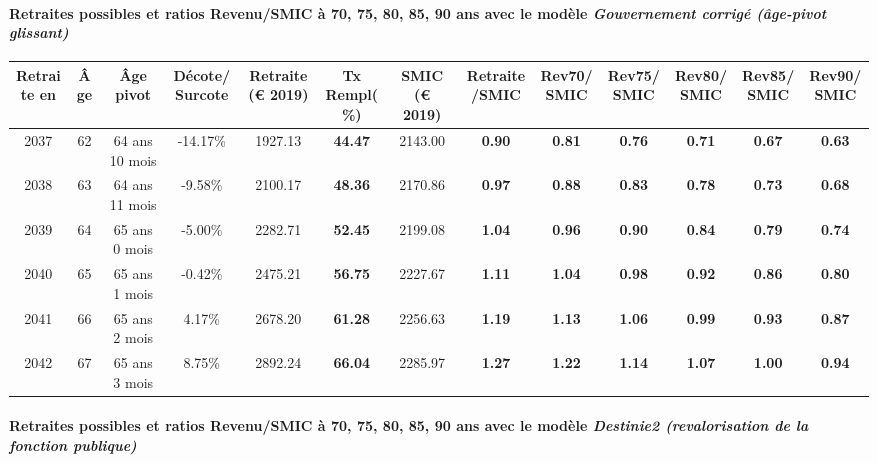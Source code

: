 \paragraph{Retraites possibles et ratios Revenu/SMIC à 70, 75, 80, 85, 90 ans avec le modèle \emph{Gouvernement corrigé (âge-pivot glissant)}}  
 
{ \scriptsize \begin{center} 
\begin{tabular}[htb]{|c|c||c|c||c|c||c||c|c|c|c|c|c|} 
\hline 
 Retraite en &  Âge &  Âge pivot &  Décote/Surcote &  Retraite (\euro{} 2019) &  Tx Rempl(\%) &  SMIC (\euro{} 2019) &  Retraite/SMIC &  Rev70/SMIC &  Rev75/SMIC &  Rev80/SMIC &  Rev85/SMIC &  Rev90/SMIC \\ 
\hline \hline 
 2037 &  62 &  64 ans 10 mois &  -14.17\% &  1927.13 &  {\bf 44.47} &  2143.00 &  {\bf {\color{red} 0.90}} &  {\bf {\color{red} 0.81}} &  {\bf {\color{red} 0.76}} &  {\bf {\color{red} 0.71}} &  {\bf {\color{red} 0.67}} &  {\bf {\color{red} 0.63}} \\ 
\hline 
 2038 &  63 &  64 ans 11 mois &  -9.58\% &  2100.17 &  {\bf 48.36} &  2170.86 &  {\bf {\color{red} 0.97}} &  {\bf {\color{red} 0.88}} &  {\bf {\color{red} 0.83}} &  {\bf {\color{red} 0.78}} &  {\bf {\color{red} 0.73}} &  {\bf {\color{red} 0.68}} \\ 
\hline 
 2039 &  64 &  65 ans 0 mois &  -5.00\% &  2282.71 &  {\bf 52.45} &  2199.08 &  {\bf 1.04} &  {\bf {\color{red} 0.96}} &  {\bf {\color{red} 0.90}} &  {\bf {\color{red} 0.84}} &  {\bf {\color{red} 0.79}} &  {\bf {\color{red} 0.74}} \\ 
\hline 
 2040 &  65 &  65 ans 1 mois &  -0.42\% &  2475.21 &  {\bf 56.75} &  2227.67 &  {\bf 1.11} &  {\bf 1.04} &  {\bf {\color{red} 0.98}} &  {\bf {\color{red} 0.92}} &  {\bf {\color{red} 0.86}} &  {\bf {\color{red} 0.80}} \\ 
\hline 
 2041 &  66 &  65 ans 2 mois &  4.17\% &  2678.20 &  {\bf 61.28} &  2256.63 &  {\bf 1.19} &  {\bf 1.13} &  {\bf 1.06} &  {\bf {\color{red} 0.99}} &  {\bf {\color{red} 0.93}} &  {\bf {\color{red} 0.87}} \\ 
\hline 
 2042 &  67 &  65 ans 3 mois &  8.75\% &  2892.24 &  {\bf 66.04} &  2285.97 &  {\bf 1.27} &  {\bf 1.22} &  {\bf 1.14} &  {\bf 1.07} &  {\bf 1.00} &  {\bf {\color{red} 0.94}} \\ 
\hline 
\hline 
\end{tabular} 
\end{center} } 
\paragraph{Retraites possibles et ratios Revenu/SMIC à 70, 75, 80, 85, 90 ans avec le modèle \emph{Destinie2 (revalorisation de la fonction publique)}}  
 
